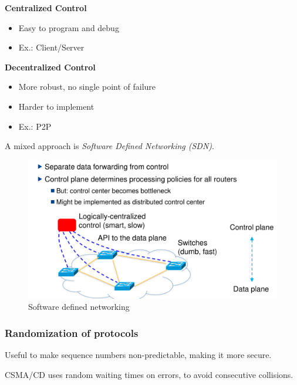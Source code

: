 \documentclass[english]{panikzettel}
\begin{document}
	\begin{halfboxl}
		\textbf{Centralized Control}
		\begin{itemize}
			\item Easy to program and debug
			\item Ex.: Client/Server 
		\end{itemize}
	\end{halfboxl}%
	\begin{halfboxr}
		\vspace{-\baselineskip}
		\textbf{Decentralized Control}
		\begin{itemize}
			\item More robust, no single point of failure
			\item Harder to implement
			\item Ex.: P2P
		\end{itemize}
	\end{halfboxr}
	
	A mixed approach is \textit{Software Defined Networking (SDN)}.

	\begin{figure}[H]
		\centering
		\includegraphics[width=\textwidth]{img/2-sdn.png}
		\caption{Software defined networking}
		\label{img-2-sdn}
	\end{figure}


	\subsubsection{Randomization of protocols}
	\label{sss-randomization-of-protocols}
	
	Useful to make sequence numbers non-predictable, making it more secure.

	CSMA/CD uses random waiting times on errors, to avoid consecutive collisions.
\end{document}
